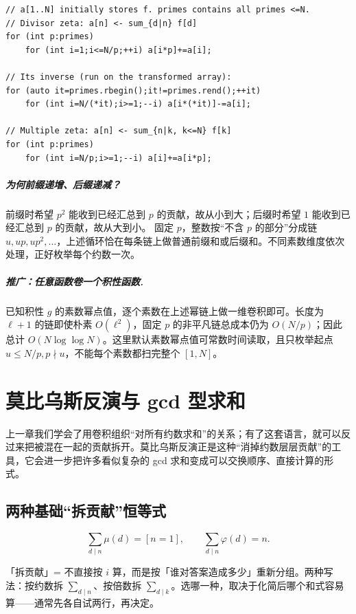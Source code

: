 \documentclass[UTF8,a4paper,11pt,twoside,openright,fontset=fandol]{ctexbook}
\theoremstyle{definition}
\begin{document}
\begin{lstlisting}
// a[1..N] initially stores f. primes contains all primes <=N.
// Divisor zeta: a[n] <- sum_{d|n} f[d]
for (int p:primes)
    for (int i=1;i<=N/p;++i) a[i*p]+=a[i];

// Its inverse (run on the transformed array):
for (auto it=primes.rbegin();it!=primes.rend();++it)
    for (int i=N/(*it);i>=1;--i) a[i*(*it)]-=a[i];

// Multiple zeta: a[n] <- sum_{n|k, k<=N} f[k]
for (int p:primes)
    for (int i=N/p;i>=1;--i) a[i]+=a[i*p];
\end{lstlisting}
\paragraph{为何前缀递增、后缀递减？}
前缀时希望 $p^2$ 能收到已经汇总到 $p$ 的贡献，故从小到大；后缀时希望 $1$ 能收到已经汇总到 $p$ 的贡献，故从大到小。
固定 $p$，整数按“不含 $p$ 的部分”分成链 $u,up,up^2,\ldots$，上述循环恰在每条链上做普通前缀和或后缀和。不同素数维度依次处理，正好枚举每个约数一次。

\paragraph{推广：任意函数卷一个积性函数.}
已知积性 $g$ 的素数幂点值，逐个素数在上述幂链上做一维卷积即可。长度为 $\ell+1$ 的链即使朴素 $O(\ell^2)$，固定 $p$ 的非平凡链总成本仍为 $O(N/p)$；因此总计 $O(N\log\log N)$。这里默认素数幂点值可常数时间读取，且只枚举起点 $u\le N/p,p\nmid u$，不能每个素数都扫完整个 $[1,N]$。



\chapter{莫比乌斯反演与 gcd 型求和}
\begin{chapterintro}[章节导读]
上一章我们学会了用卷积组织“对所有约数求和”的关系；有了这套语言，就可以反过来把被混在一起的贡献拆开。莫比乌斯反演正是这种“消掉约数层层贡献”的工具，它会进一步把许多看似复杂的 gcd 求和变成可以交换顺序、直接计算的形式。
\end{chapterintro}

\section{两种基础“拆贡献”恒等式}
\[
\sum_{d\mid n}\mu(d)=[n=1],\qquad
\sum_{d\mid n}\varphi(d)=n.
\]

\begin{tip}[词义：拆贡献]
「拆贡献」= 不直接按 $i$ 算，而是按「谁对答案造成多少」重新分组。两种写法：按约数拆 $\sum_{d\mid n}$、按倍数拆 $\sum_{d\mid k}$。选哪一种，取决于化简后哪个和式容易算——通常先各自试两行，再决定。
\end{tip}
\end{document}
